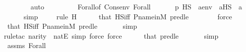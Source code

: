 \begin{isabellebody}
\ \ \ \ \ \ \isamarkupfalse%
\ auto\isanewline
\ \ \isamarkupfalse%
\isanewline
\isanewline
\ \ \isamarkupfalse%
\isanewline
\ \ \isamarkupfalse%
\ Forall{\isacharparenleft}{\kern0pt}{}{\isacharparenright}{\kern0pt}{\isacharbrackleft}{\kern0pt}of\ {\isachardoublequoteopen}Cons{\isacharparenleft}{\kern0pt}{\isacharunderscore}{\kern0pt}{\isacharcomma}{\kern0pt}env{\isacharparenright}{\kern0pt}{\isachardoublequoteclose}{\isacharbrackright}{\kern0pt}\ Forall{\isacharparenleft}{\kern0pt}{}{\isacharcomma}{\kern0pt}{}{\isacharminus}{\kern0pt}{}{\isacharparenright}{\kern0pt}\isanewline
\ \ \isamarkupfalse%
\isanewline
\ \ \isamarkupfalse%
\ {\isachardoublequoteopen}p\ {\isasymtturnstile}HS\ {\isasymphi}\ {\isacharparenleft}{\kern0pt}{\isacharbrackleft}{\kern0pt}a{\isacharbrackright}{\kern0pt}{\isacharat}{\kern0pt}env{\isacharparenright}{\kern0pt}{\isachardoublequoteclose}\ \ {\isachardoublequoteopen}a{\isasymin}HS{\isachardoublequoteclose}\ \ a\isanewline
\ \ \ \ \isamarkupfalse%
\ simp\isanewline
\ \ \ \ \isamarkupfalse%
{\isacharparenleft}{\kern0pt}rule\ H{\isacharparenright}{\kern0pt}\isanewline
\ \ \ \ \isamarkupfalse%
\ that\ HS{\isacharunderscore}{\kern0pt}iff\ P{\isacharunderscore}{\kern0pt}name{\isacharunderscore}{\kern0pt}in{\isacharunderscore}{\kern0pt}M\ pred{\isacharunderscore}{\kern0pt}le\isanewline
\ \ \ \ \ \ \isamarkupfalse%
\ force\isanewline
\ \ \ \ \isamarkupfalse%
\ that\ HS{\isacharunderscore}{\kern0pt}iff\ P{\isacharunderscore}{\kern0pt}name{\isacharunderscore}{\kern0pt}in{\isacharunderscore}{\kern0pt}M\ pred{\isacharunderscore}{\kern0pt}le\isanewline
\ \ \ \ \ \isamarkupfalse%
\ simp\isanewline
\ \ \ \ \ \isamarkupfalse%
{\isacharparenleft}{\kern0pt}rule{\isacharunderscore}{\kern0pt}tac\ n{\isacharequal}{\kern0pt}{\isachardoublequoteopen}arity{\isacharparenleft}{\kern0pt}{\isasymphi}{\isacharparenright}{\kern0pt}{\isachardoublequoteclose}\ \ natE{\isacharcomma}{\kern0pt}\ simp{\isacharcomma}{\kern0pt}\ force{\isacharcomma}{\kern0pt}\ force{\isacharparenright}{\kern0pt}\isanewline
\ \ \ \ \isamarkupfalse%
\ that\ pred{\isacharunderscore}{\kern0pt}le{}\ \isanewline
\ \ \ \ \isamarkupfalse%
\ simp\isanewline
\ \ \isamarkupfalse%
\ assms\ Forall\isanewline
\ \ \isamarkupfalse%

\end{isabellebody}
